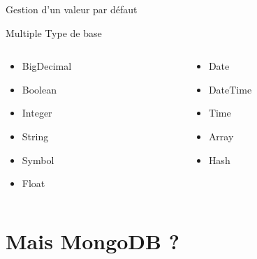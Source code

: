 \documentclass{beamer}
\begin{document}
\begin{frame}
  \begin{center}
    \Huge{}
    Gestion d'un valeur par défaut
  \end{center}
\end{frame}

\begin{frame}
  
\end{frame}

\begin{frame}
  
\end{frame}

\begin{frame}
  \begin{center}
    \Huge{}
    Multiple Type de base
  \end{center}
\end{frame}

\begin{frame}
  \begin{columns}[t]

    \begin{column}{5cm}
      \begin{itemize}
        \item BigDecimal
        \item Boolean
        \item Integer
        \item String
        \item Symbol
        \item Float
      \end{itemize}
    \end{column}

    \begin{column}{5cm}
      \begin{itemize}
        \item Date
        \item DateTime
        \item Time
        \item Array
        \item Hash
      \end{itemize}
    \end{column}

  \end{columns}
\end{frame}

\section{Mais MongoDB ?}
\end{document}
